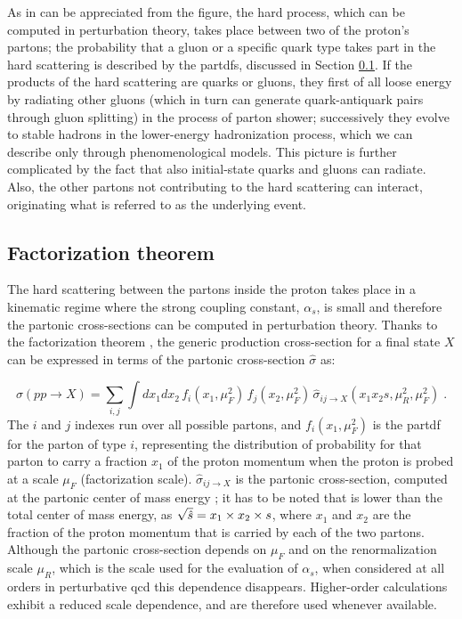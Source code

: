 As in can be appreciated from the figure, the hard process, which can be computed in perturbation theory, takes place between two of the proton's partons; the probability that a gluon or a specific quark type takes part in the hard scattering is described by the \glspl{partdf}, discussed in Section \ref{sec:ppint:hardscatter}. If the products of the hard scattering are quarks or gluons, they first of all loose energy by radiating other gluons (which in turn can generate quark-antiquark pairs through gluon splitting) in the process of parton shower;
successively they evolve to stable hadrons in the lower-energy hadronization process, which we can describe only through phenomenological models.
This picture is further complicated by the fact that also initial-state quarks and gluons can radiate. Also, the other partons not contributing to the hard scattering can interact, originating what is referred to as the underlying event. 

\subsection{Factorization theorem}
\label{sec:ppint:hardscatter}

The hard scattering between the partons inside the proton takes place in a kinematic regime where the strong coupling constant, $\alpha_s$, 
is small and therefore the partonic cross-sections can be computed in perturbation theory. 
Thanks to the factorization theorem \cite{doi:10.1146}, the generic production cross-section for a final state $X$ can be expressed in terms of the partonic cross-section $\hat\sigma$ as:

\begin{equation}
  \sigma(pp\rightarrow X) = \sum_{i,j} \int dx_1 dx_2\, 
     f_{i}(x_1,\mu_F^2)\, f_{j}(x_2,\mu_F^2)\, 
     \hat\sigma_{ij\rightarrow X}(x_1 x_2 s, \mu_R^2, \mu_F^2) \; .
  \label{eq:general-cross-section}
\end{equation}
The $i$ and $j$ indexes run over all possible partons, and $f_{i}(x_1,\mu_F^2)$ is the \gls{partdf} for the parton of type $i$, representing 
the distribution of probability for that parton to carry a fraction $x_1$ of the proton momentum when the proton is probed at a scale $\mu_F$
(factorization scale). $\hat\sigma_{ij\rightarrow X}$ is the partonic cross-section, computed at the partonic center of mass energy \cmpart;   
it has to be noted that \cmpart is lower than the total center of mass energy, as 
$\sqrt{\hat{s}} = x_1 \times x_2 \times s$, 
where $x_1$ and $x_2$ are the fraction of the proton momentum that is carried by each of the two partons.
Although the partonic cross-section depends on $\mu_F$ and on the renormalization scale $\mu_R$, 
which is the scale used for the evaluation of $\alpha_s$, 
when considered at all orders in perturbative \gls{qcd} this dependence disappears.
Higher-order calculations exhibit a reduced scale dependence, and are therefore used whenever available. 


